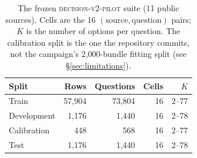 \begin{table}[t]
\centering
\footnotesize
\caption{The frozen \textsc{decision-v2-pilot} suite (11 public sources). Cells are the 16
$(\text{source},\text{question})$ pairs; $K$ is the number of options per
question. The calibration split is the one the repository commits, not the
campaign's 2{,}000-bundle fitting split (see \S\ref{sec:limitations}).}
\label{tab:dataset}
\begin{tabular}{lrrrr}
\toprule
Split & Rows & Questions & Cells & $K$ \\
\midrule
Train & 57,904 & 73,804 & 16 & 2--77 \\
Development & 1,176 & 1,440 & 16 & 2--78 \\
Calibration & 448 & 568 & 16 & 2--77 \\
Test & 1,176 & 1,440 & 16 & 2--78 \\
\bottomrule
\end{tabular}
\end{table}
